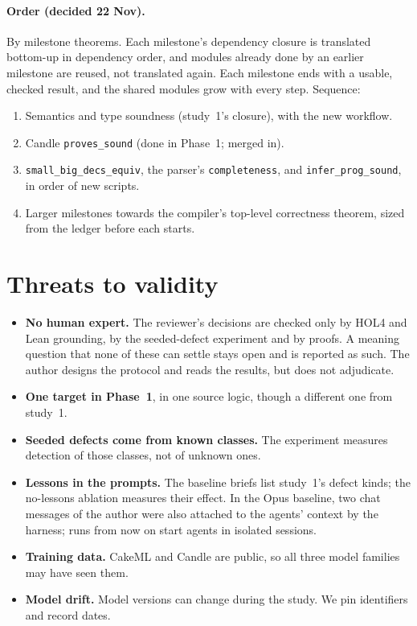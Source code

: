 \documentclass[11pt,a4paper]{article}
\newcommand{\code}[1]{\texttt{#1}}
\begin{document}
\paragraph{Order (decided 22 Nov).} By milestone theorems. Each milestone's dependency closure is translated bottom-up in dependency order, and modules already done by an earlier milestone are reused, not translated again. Each milestone ends with a usable, checked result, and the shared modules grow with every step. Sequence:
\begin{enumerate}
\item Semantics and type soundness (study~1's closure), with the new workflow.
\item Candle \code{proves\_sound} (done in Phase~1; merged in).
\item \code{small\_big\_decs\_equiv}, the parser's \code{completeness}, and \code{infer\_prog\_sound}, in order of new scripts.
\item Larger milestones towards the compiler's top-level correctness theorem, sized from the ledger before each starts.
\end{enumerate}

\section{Threats to validity}
\begin{itemize}
\item \textbf{No human expert.} The reviewer's decisions are checked only by HOL4 and Lean grounding, by the seeded-defect experiment and by proofs. A meaning question that none of these can settle stays open and is reported as such. The author designs the protocol and reads the results, but does not adjudicate.
\item \textbf{One target in Phase~1}, in one source logic, though a different one from study~1.
\item \textbf{Seeded defects come from known classes.} The experiment measures detection of those classes, not of unknown ones.
\item \textbf{Lessons in the prompts.} The baseline briefs list study~1's defect kinds; the no-lessons ablation measures their effect. In the Opus baseline, two chat messages of the author were also attached to the agents' context by the harness; runs from now on start agents in isolated sessions.
\item \textbf{Training data.} CakeML and Candle are public, so all three model families may have seen them.
\item \textbf{Model drift.} Model versions can change during the study. We pin identifiers and record dates.
\end{itemize}
\end{document}
